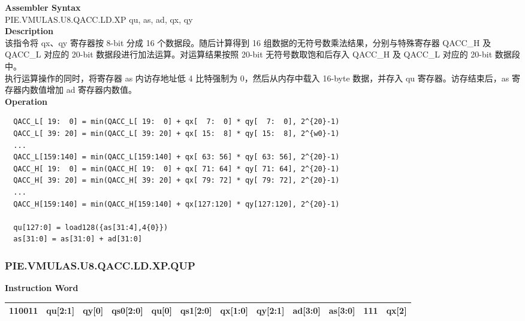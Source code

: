 \textbf{Assembler Syntax} \\
PIE.VMULAS.U8.QACC.LD.XP qu, as, ad, qx, qy \\
\textbf{Description} \\
该指令将 qx、qy 寄存器按 8-bit 分成 16 个数据段。随后计算得到 16 组数据的无符号数乘法结果，分别与特殊寄存器 QACC\_H 及 QACC\_L 对应的 20-bit 数据段进行加法运算。对运算结果按照 20-bit 无符号数取饱和后存入 QACC\_H 及 QACC\_L 对应的 20-bit 数据段中。\\
执行运算操作的同时，将寄存器 as 内访存地址低 4 比特强制为 0，然后从内存中载入 16-byte 数据，并存入 qu 寄存器。访存结束后，as 寄存器内数值增加 ad 寄存器内数值。\\
\textbf{Operation}
\begin{lstlisting}
  QACC_L[ 19:  0] = min(QACC_L[ 19:  0] + qx[  7:  0] * qy[  7:  0], 2^{20}-1)
  QACC_L[ 39: 20] = min(QACC_L[ 39: 20] + qx[ 15:  8] * qy[ 15:  8], 2^{w0}-1)
  ...
  QACC_L[159:140] = min(QACC_L[159:140] + qx[ 63: 56] * qy[ 63: 56], 2^{20}-1)
  QACC_H[ 19:  0] = min(QACC_H[ 19:  0] + qx[ 71: 64] * qy[ 71: 64], 2^{20}-1)
  QACC_H[ 39: 20] = min(QACC_H[ 39: 20] + qx[ 79: 72] * qy[ 79: 72], 2^{20}-1)
  ...
  QACC_H[159:140] = min(QACC_H[159:140] + qx[127:120] * qy[127:120], 2^{20}-1)

  qu[127:0] = load128({as[31:4],4{0}})
  as[31:0] = as[31:0] + ad[31:0]
\end{lstlisting}

\newpage
\subsubsection{PIE.VMULAS.U8.QACC.LD.XP.QUP}\label{instruction:PIEVMULASU8QACCLDXPQUP}
\setlength\tabcolsep{6pt}
\textbf{Instruction Word} \\
\begin{tabular}{|c|c|c|c|c|c|c|c|c|c|c|c|}
	\hline
	110011 & qu[2:1] & qy[0] & qs0[2:0] & qu[0] & qs1[2:0] & qx[1:0] & qy[2:1] & ad[3:0] & as[3:0] & 111 & qx[2] \\
	\hline
\end{tabular}

